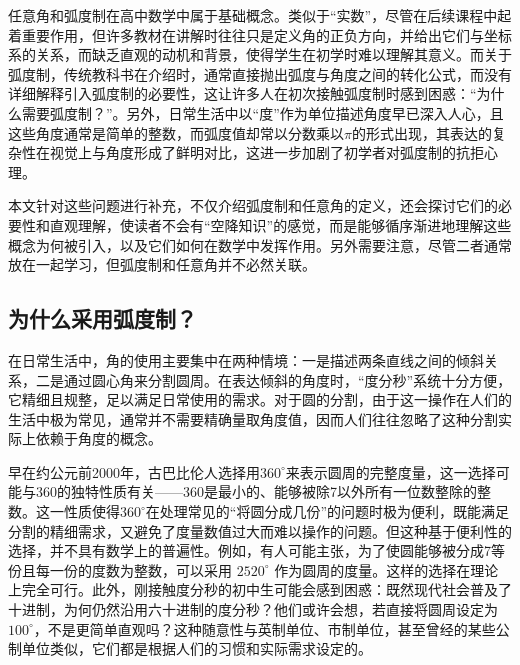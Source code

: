 

任意角和弧度制在高中数学中属于基础概念。类似于“实数”，尽管在后续课程中起着重要作用，但许多教材在讲解时往往只是定义角的正负方向，并给出它们与坐标系的关系，而缺乏直观的动机和背景，使得学生在初学时难以理解其意义。而关于弧度制，传统教科书在介绍时，通常直接抛出弧度与角度之间的转化公式，而没有详细解释引入弧度制的必要性，这让许多人在初次接触弧度制时感到困惑：“为什么需要弧度制？”。另外，日常生活中以“度”作为单位描述角度早已深入人心，且这些角度通常是简单的整数，而弧度值却常以分数乘以$\pi$的形式出现，其表达的复杂性在视觉上与角度形成了鲜明对比，这进一步加剧了初学者对弧度制的抗拒心理。

本文针对这些问题进行补充，不仅介绍弧度制和任意角的定义，还会探讨它们的必要性和直观理解，使读者不会有“空降知识”的感觉，而是能够循序渐进地理解这些概念为何被引入，以及它们如何在数学中发挥作用。另外需要注意，尽管二者通常放在一起学习，但弧度制和任意角并不必然关联。

\subsection{为什么采用弧度制？}

在日常生活中，角的使用主要集中在两种情境：一是描述两条直线之间的倾斜关系，二是通过圆心角来分割圆周。在表达倾斜的角度时，“度分秒”系统十分方便，它精细且规整，足以满足日常使用的需求。对于圆的分割，由于这一操作在人们的生活中极为常见，通常并不需要精确量取角度值，因而人们往往忽略了这种分割实际上依赖于角度的概念。

早在约公元前2000年，古巴比伦人选择用$360^\circ$来表示圆周的完整度量，这一选择可能与360的独特性质有关——360是最小的、能够被除7以外所有一位数整除的整数。这一性质使得$360^\circ$在处理常见的“将圆分成几份”的问题时极为便利，既能满足分割的精细需求，又避免了度量数值过大而难以操作的问题。但这种基于便利性的选择，并不具有数学上的普遍性。例如，有人可能主张，为了使圆能够被分成7等份且每一份的度数为整数，可以采用 $2520^\circ$ 作为圆周的度量。这样的选择在理论上完全可行。此外，刚接触度分秒的初中生可能会感到困惑：既然现代社会普及了十进制，为何仍然沿用六十进制的度分秒？他们或许会想，若直接将圆周设定为 $100^\circ$，不是更简单直观吗？这种随意性与英制单位、市制单位，甚至曾经的某些公制单位类似，它们都是根据人们的习惯和实际需求设定的。


